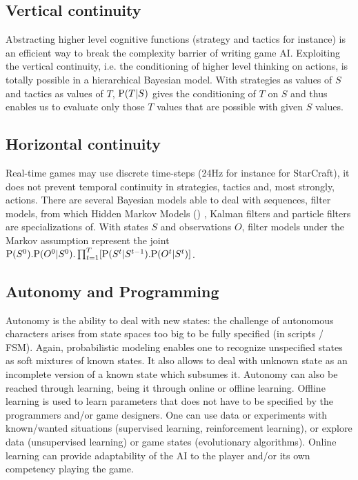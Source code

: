 \subsection{Vertical continuity}
Abstracting higher level cognitive functions (strategy and tactics for instance) is an efficient way to break the complexity barrier of writing game AI. Exploiting the vertical continuity, i.e. the conditioning of higher level thinking on actions, is totally possible in a hierarchical Bayesian model. With strategies as values of $S$ and tactics as values of $T$, $\mathrm{P}(T|S)$ gives the conditioning of $T$ on $S$ and thus enables us to evaluate only those $T$ values that are possible with given $S$ values.

\subsection{Horizontal continuity}
Real-time games may use discrete time-steps (24Hz for instance for StarCraft), it does not prevent temporal continuity in strategies, tactics and, most strongly, actions. There are several Bayesian models able to deal with sequences, filter models, from which Hidden Markov Models () \citep{Rabiner}, Kalman filters \citep{Kalman1960} and particle filters \citep{particleFiltering} are specializations of. With states $S$ and observations $O$, filter models under the Markov assumption represent the joint $\mathrm{P}(S^0).\mathrm{P}(O^0|S^0).\prod_{t=1}^T[\mathrm{P}(S^t | S^{t-1}).\mathrm{P}(O^t|S^t)]$.

\subsection{Autonomy and Programming}
Autonomy is the ability to deal with new states: the challenge of autonomous characters arises from state spaces too big to be fully specified (in scripts / FSM). Again, probabilistic modeling enables one to recognize unspecified states as soft mixtures of known states. It also allows to deal with unknown state as an incomplete version of a known state which subsumes it. Autonomy can also be reached through learning, being it through online or offline learning. Offline learning is used to learn parameters that does not have to be specified by the programmers and/or game designers. One can use data or experiments with known/wanted situations (supervised learning, reinforcement learning), or explore data (unsupervised learning) or game states (evolutionary algorithms). Online learning can provide adaptability of the AI to the player and/or its own competency playing the game.

